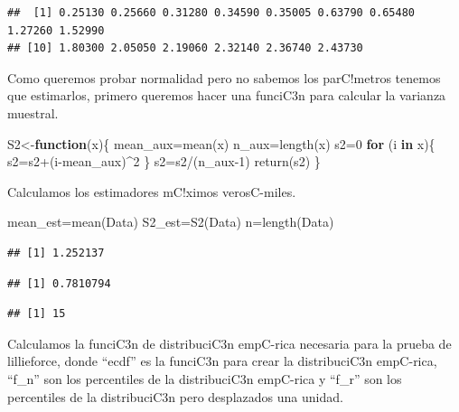 \documentclass[
]{article}
\newenvironment{Shaded}{\begin{snugshade}}{\end{snugshade}}
\newcommand{\ControlFlowTok}[1]{\textcolor[rgb]{0.13,0.29,0.53}{\textbf{#1}}}
\newcommand{\DecValTok}[1]{\textcolor[rgb]{0.00,0.00,0.81}{#1}}
\newcommand{\FunctionTok}[1]{\textcolor[rgb]{0.00,0.00,0.00}{#1}}
\newcommand{\NormalTok}[1]{#1}
\newcommand{\OtherTok}[1]{\textcolor[rgb]{0.56,0.35,0.01}{#1}}
\newcommand{\SpecialCharTok}[1]{\textcolor[rgb]{0.00,0.00,0.00}{#1}}
\begin{document}
\begin{verbatim}
##  [1] 0.25130 0.25660 0.31280 0.34590 0.35005 0.63790 0.65480 1.27260 1.52990
## [10] 1.80300 2.05050 2.19060 2.32140 2.36740 2.43730
\end{verbatim}

Como queremos probar normalidad pero no sabemos los parC!metros tenemos
que estimarlos, primero queremos hacer una funciC3n para calcular la
varianza muestral.

\begin{Shaded}
\begin{Highlighting}[]
\NormalTok{S2}\OtherTok{\textless{}{-}}\ControlFlowTok{function}\NormalTok{(x)\{}
\NormalTok{  mean\_aux}\OtherTok{=}\FunctionTok{mean}\NormalTok{(x)}
\NormalTok{  n\_aux}\OtherTok{=}\FunctionTok{length}\NormalTok{(x)}
\NormalTok{  s2}\OtherTok{=}\DecValTok{0}
  \ControlFlowTok{for}\NormalTok{ (i }\ControlFlowTok{in}\NormalTok{ x)\{}
\NormalTok{    s2}\OtherTok{=}\NormalTok{s2}\SpecialCharTok{+}\NormalTok{(i}\SpecialCharTok{{-}}\NormalTok{mean\_aux)}\SpecialCharTok{\^{}}\DecValTok{2}
\NormalTok{  \}}
\NormalTok{  s2}\OtherTok{=}\NormalTok{s2}\SpecialCharTok{/}\NormalTok{(n\_aux}\DecValTok{{-}1}\NormalTok{)}
  \FunctionTok{return}\NormalTok{(s2)}
\NormalTok{\}}
\end{Highlighting}
\end{Shaded}

Calculamos los estimadores mC!ximos verosC-miles.

\begin{Shaded}
\begin{Highlighting}[]
\NormalTok{mean\_est}\OtherTok{=}\FunctionTok{mean}\NormalTok{(Data)}
\NormalTok{S2\_est}\OtherTok{=}\FunctionTok{S2}\NormalTok{(Data)}
\NormalTok{n}\OtherTok{=}\FunctionTok{length}\NormalTok{(Data)}
\end{Highlighting}
\end{Shaded}

\begin{verbatim}
## [1] 1.252137
\end{verbatim}

\begin{verbatim}
## [1] 0.7810794
\end{verbatim}

\begin{verbatim}
## [1] 15
\end{verbatim}

Calculamos la funciC3n de distribuciC3n empC-rica necesaria para la
prueba de lillieforce, donde ``ecdf'' es la funciC3n para crear la
distribuciC3n empC-rica, ``f\_n'' son los percentiles de la
distribuciC3n empC-rica y ``f\_r'' son los percentiles de la
distribuciC3n pero desplazados una unidad.
\end{document}
